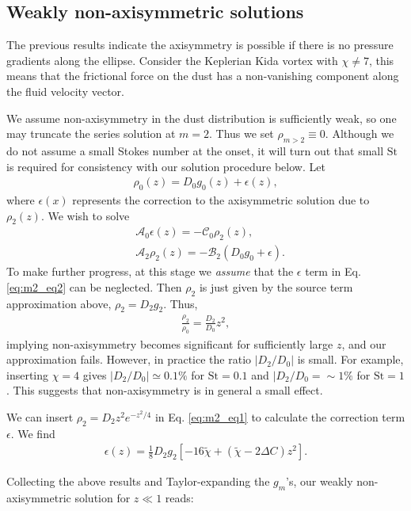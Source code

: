 \documentclass[12pt]{article} %
\begin{document}
\subsection{Weakly non-axisymmetric solutions}
The previous results indicate the axisymmetry is possible if there is no pressure gradients along the ellipse. Consider the Keplerian Kida vortex with $\chi\neq 7$, this means that the frictional force on the dust has a non-vanishing component along the fluid velocity vector. 

We assume non-axisymmetry in the dust distribution is sufficiently weak, so one may truncate the series solution at $m=2$. Thus we set $\rho_{m>2}\equiv0$. Although we do not assume a small Stokes number at the onset, it will turn out that small $\mathrm{St}$ is required for consistency with our solution procedure below. Let
\begin{align}
\rho_0(z) = D_0g_0(z) + \epsilon(z),
\end{align}
where $\epsilon(x)$ represents the correction to the axisymmetric
solution due to $\rho_2(z)$. We wish to solve
\begin{align}
&\mathcal{A}_0\epsilon(z) = -\mathcal{C}_0\rho_2(z),\label{eq:m2_eq1}\\
&\mathcal{A}_2\rho_2(z)   = -\mathcal{B}_2\left(D_0g_0 + \epsilon\right).\label{eq:m2_eq2}
\end{align}
To make further progress, at this stage we \emph{assume} that the
$\epsilon$ term in Eq. \ref{eq:m2_eq2} can be neglected. Then $\rho_2$ is just given 
by the source term approximation above, $\rho_2 = D_2 g_2$. Thus,
\begin{align}
\frac{\rho_2}{\rho_0} = \frac{D_2}{D_0}z^2,
\end{align}
implying non-axisymmetry becomes significant for sufficiently large $z$, and our approximation fails. However, in practice the ratio $|D_2/D_0|$ is small. 
For example, inserting $\chi=4$ gives $|D_2/D_0|\simeq0.1\%$ for $\mathrm{St}=0.1$ and $|D_2/D_0=\sim 1\%$ for $\mathrm{St}=1$. This suggests that non-axisymmetry is in general a small effect. 

We can insert $\rho_2 = D_2 z^2e^{-z^2/4}$ in Eq. \ref{eq:m2_eq1} to
calculate the correction term $\epsilon$. We find
\begin{align}
\epsilon(z) = \frac{1}{8}D_2g_2\left[-16\tilde{\chi}+\left(\tilde{\chi} - 2\Delta C\right)z^2\right].
\end{align}

Collecting the above results and Taylor-expanding the $g_m$'s, our
weakly non-axisymmetric solution for $z\ll 1$ reads:
\end{document}
